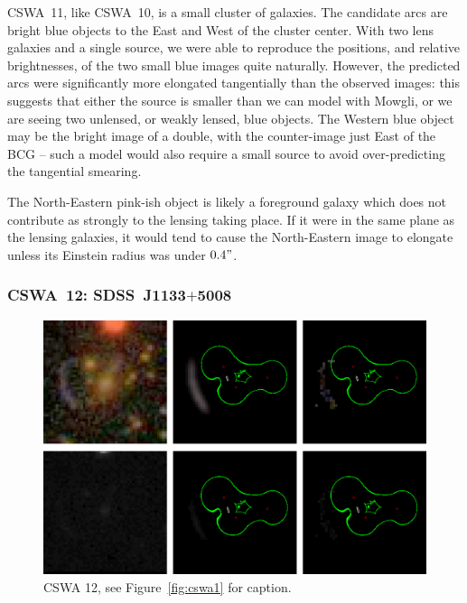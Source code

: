 \documentclass[iop]{emulateapj}
\def\theapplet{{\sc Mowgli}\xspace}
\begin{document}
CSWA~11, like CSWA~10, is a small cluster of galaxies.  The candidate arcs are
bright blue objects to the East and West of the cluster center.  With two lens
galaxies and a single source, we were able to reproduce the positions, and
relative brightnesses, of the two small blue images quite naturally. However,
the predicted arcs were significantly more elongated tangentially than the
observed images: this suggests that either the source is smaller than we can
model with \theapplet, or we are seeing two unlensed, or weakly lensed, blue
objects. The Western blue object may be the bright image of a double, with the
counter-image just East of the BCG -- such a model would also require a small
source to avoid over-predicting the tangential smearing.

The North-Eastern pink-ish object is  likely a foreground galaxy which does not
contribute as strongly  to the lensing taking place. If it were in the same
plane as the lensing galaxies, it would tend to cause the North-Eastern image to
elongate unless its Einstein radius was under $0.4"$.



\subsubsection*{CSWA~12: SDSS\ J1133$+$5008}
\label{sec:results:indinotes:cswa12}


\begin{figure}[!ht]
	\centering\includegraphics[width=\linewidth]{figs/12.eps}
	\caption{CSWA 12, see Figure~\ref{fig:cswa1} for caption.}
	\label{fig:cswa12}
\end{figure}
\end{document}
